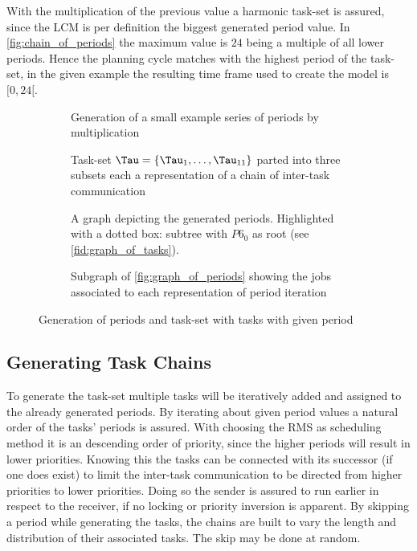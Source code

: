 With the multiplication of the previous value a harmonic task-set is assured, since the \ac{LCM} is per definition the biggest generated period value.
In \cref{fig:chain_of_periods} the maximum value is $24$ being a multiple of all lower periods.
Hence the planning cycle matches with the highest period of the task-set, in the given example the resulting time frame used to create the model is $[0,24[$.

\begin{figure}[ht]
	\begin{subfigure}[c]{0.45\textwidth}
		\resizebox{\textwidth}{!}{%
			\label{fig:chain_of_periods}
		
		}
		\caption{Generation of a small example series of periods by multiplication}
	\end{subfigure}
	\hfill
	\begin{subfigure}[c]{0.45\textwidth}
		\resizebox{\textwidth}{!}{%
			\label{fig:chain_of_tasks}
			
		}
		\caption{Task-set $\Tau=\{\Tau_{1}, \ldots, \Tau_{11}\}$ parted into three subsets each a representation of a chain of inter-task communication}
	\end{subfigure}
	\begin{subfigure}[c]{0.450\textwidth}
		\resizebox{\textwidth}{!}{%
			\label{fig:graph_of_periods}
			
		}
		\caption{A graph depicting the generated periods. Highlighted with a dotted box: subtree with $P6_0$ as root (see \cref{fid:graph_of_tasks}).}
	\end{subfigure}
	\hfill
	\begin{subfigure}[c]{0.45\textwidth}
		\resizebox{\textwidth}{!}{%
			\label{fig:graph_of_tasks}
			
		}
		\caption{Subgraph of \cref{fig:graph_of_periods} showing the jobs associated to each representation of period iteration}
	\end{subfigure}
	\caption{Generation of periods and task-set with tasks with given period}
\end{figure}

\subsection{Generating Task Chains}\label{sec:concept_task_chains}
To generate the task-set multiple tasks will be iteratively added and assigned to the already generated periods.
By iterating about given period values a natural order of the tasks' periods is assured.
With choosing the \ac{RMS} as scheduling method it is an descending order of priority, since the higher periods will result in lower priorities.
Knowing this the tasks can be connected with its successor (if one does exist) to limit the inter-task communication to be directed from higher priorities to lower priorities.
Doing so the sender is assured to run earlier in respect to the receiver, if no locking or priority inversion is apparent. 
By skipping a period while generating the tasks, the chains are built to vary the length and distribution of their associated tasks.
The skip may be done at random. 

